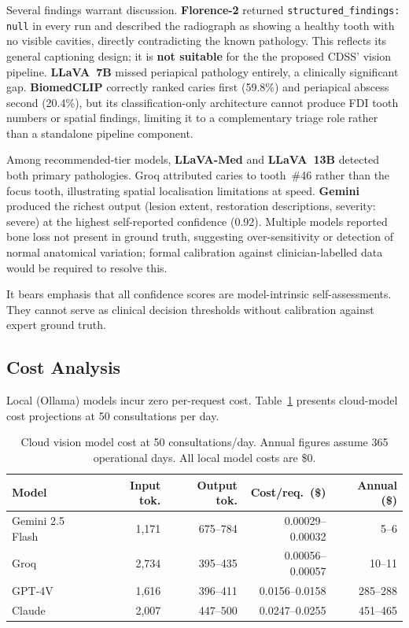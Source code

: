 \documentclass[12pt,a4paper]{report}
\begin{document}
Several findings warrant discussion. \textbf{Florence-2} returned
\texttt{structured\_findings: null} in every run and described the radiograph as
showing a healthy tooth with no visible cavities, directly contradicting the
known pathology. This reflects its general captioning design; it is \textbf{not
suitable} for the the proposed CDSS' vision pipeline. \textbf{LLaVA~7B} missed periapical
pathology entirely, a clinically significant gap. \textbf{BiomedCLIP} correctly
ranked caries first (59.8\%) and periapical abscess second (20.4\%), but its
classification-only architecture cannot produce FDI tooth numbers or spatial
findings, limiting it to a complementary triage role rather than a standalone
pipeline component.

Among recommended-tier models, \textbf{LLaVA-Med} and \textbf{LLaVA~13B}
detected both primary pathologies. Groq attributed caries to tooth~\#46 rather
than the focus tooth, illustrating spatial localisation limitations at speed.
\textbf{Gemini} produced the richest output (lesion extent, restoration
descriptions, severity: severe) at the highest self-reported confidence (0.92).
Multiple models reported bone loss not present in ground truth, suggesting
over-sensitivity or detection of normal anatomical variation; formal calibration
against clinician-labelled data would be required to resolve this.

It bears emphasis that all confidence scores are model-intrinsic self-assessments.
They cannot serve as clinical decision thresholds without calibration against
expert ground truth.

\subsection{Cost Analysis}
\label{subsec:results_cost_vision}

Local (Ollama) models incur zero per-request cost. Table~\ref{tab:cost_vision}
presents cloud-model cost projections at 50 consultations per day.

\begin{table}[H]
\centering
\caption{Cloud vision model cost at 50 consultations/day.
Annual figures assume 365 operational days. All local model costs are \$0.}
\label{tab:cost_vision}
\small
\renewcommand{\arraystretch}{1.2}
\begin{tabularx}{\textwidth}{@{}l r r r r@{}}
\toprule
\textbf{Model} & \textbf{Input tok.} & \textbf{Output tok.} & \textbf{Cost/req.\ (\$)} & \textbf{Annual (\$)} \\
\midrule
Gemini 2.5 Flash & 1{,}171 & 675--784 & 0.00029--0.00032 &   5--6 \\
Groq             & 2{,}734 & 395--435 & 0.00056--0.00057 & 10--11 \\
GPT-4V           & 1{,}616 & 396--411 & 0.0156--0.0158   & 285--288 \\
Claude           & 2{,}007 & 447--500 & 0.0247--0.0255   & 451--465 \\
\bottomrule
\end{tabularx}
\end{table}
\end{document}
